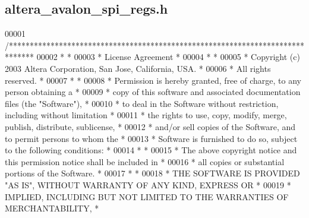 \subsection{altera\+\_\+avalon\+\_\+spi\+\_\+regs.\+h}
\label{altera__avalon__spi__regs_8h_source}

\begin{DoxyCode}
00001 \textcolor{comment}{/******************************************************************************}
00002 \textcolor{comment}{*                                                                             *}
00003 \textcolor{comment}{* License Agreement                                                           *}
00004 \textcolor{comment}{*                                                                             *}
00005 \textcolor{comment}{* Copyright (c) 2003 Altera Corporation, San Jose, California, USA.           *}
00006 \textcolor{comment}{* All rights reserved.                                                        *}
00007 \textcolor{comment}{*                                                                             *}
00008 \textcolor{comment}{* Permission is hereby granted, free of charge, to any person obtaining a     *}
00009 \textcolor{comment}{* copy of this software and associated documentation files (the "Software"),  *}
00010 \textcolor{comment}{* to deal in the Software without restriction, including without limitation   *}
00011 \textcolor{comment}{* the rights to use, copy, modify, merge, publish, distribute, sublicense,    *}
00012 \textcolor{comment}{* and/or sell copies of the Software, and to permit persons to whom the       *}
00013 \textcolor{comment}{* Software is furnished to do so, subject to the following conditions:        *}
00014 \textcolor{comment}{*                                                                             *}
00015 \textcolor{comment}{* The above copyright notice and this permission notice shall be included in  *}
00016 \textcolor{comment}{* all copies or substantial portions of the Software.                         *}
00017 \textcolor{comment}{*                                                                             *}
00018 \textcolor{comment}{* THE SOFTWARE IS PROVIDED "AS IS", WITHOUT WARRANTY OF ANY KIND, EXPRESS OR  *}
00019 \textcolor{comment}{* IMPLIED, INCLUDING BUT NOT LIMITED TO THE WARRANTIES OF MERCHANTABILITY,    *}

\end{DoxyCode}
